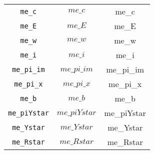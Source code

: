 \begin{center}
\begin{longtable}{ccc}
\texttt{me\_c} & $me\_c$ & me\_c\\
\texttt{me\_E} & $me\_E$ & me\_E\\
\texttt{me\_w} & $me\_w$ & me\_w\\
\texttt{me\_i} & $me\_i$ & me\_i\\
\texttt{me\_pi\_im} & $me\_pi\_im$ & me\_pi\_im\\
\texttt{me\_pi\_x} & $me\_pi\_x$ & me\_pi\_x\\
\texttt{me\_b} & $me\_b$ & me\_b\\
\texttt{me\_piYstar} & $me\_piYstar$ & me\_piYstar\\
\texttt{me\_Ystar} & $me\_Ystar$ & me\_Ystar\\
\texttt{me\_Rstar} & $me\_Rstar$ & me\_Rstar\\
\hline%
\end{longtable}
\end{center}
